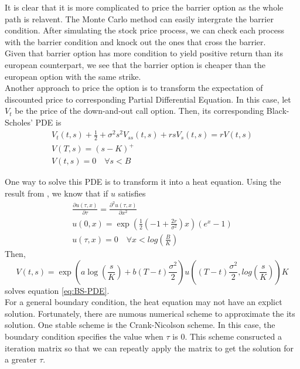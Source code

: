 \documentclass[a4paper, 11pt]{article}
\begin{document}
It is clear that it is more complicated to price the barrier option as the whole path is relavent. The Monte Carlo method can easily intergrate the barrier condition. After simulating the stock price process, we can check each process with the barrier condition and knock out the ones that cross the barrier.\\

Given that barrier option has more condition to yield positive return than its european counterpart, we see that the barrier option is cheaper than the european option with the same strike.\\

Another approach to price the option is to transform the expectation of discounted price to corresponding Partial Differential Equation. In this case, let $V_t$ be the price of the down-and-out call option. Then, its corresponding Black-Scholes' PDE is
\begin{gather}
	V_t(t,s) + \frac{1}{2} + \sigma^2 s^2 V_{ss}(t,s) + rsV_s(t,s) = rV(t,s)\nonumber\\
	V(T,s) = (s-K)^+\\
	V(t,s) = 0 \quad \forall s < B\nonumber
	\label{eq:BS-PDE}
\end{gather}

One way to solve this PDE is to transform it into a heat equation. Using the result from %
, we know that if $u$ satisfies
\begin{gather}
	\frac{\partial u(\tau,x)}{\partial \tau} = \frac{\partial^2 u(\tau,x)}{\partial x^2}\nonumber\\
	u(0,x) = \exp(\frac{1}{2}(-1+\frac{2r}{\sigma^2})x)(e^x-1)\\
	u(\tau, x) = 0 \quad \forall x < log(\frac{B}{K})\nonumber
\label{eq:heat_equation}
\end{gather}
Then, 
\begin{equation}
	V(t,s) = \exp(a\log(\frac{s}{K})+b(T-t)\frac{\sigma^2}{2})u\left((T-t )\frac{\sigma^2}{2}, log(\frac{s}{K}) \right)K
	\label{eq:BS-PDE_solution}
\end{equation}
solves equation \ref{eq:BS-PDE}.\\

For a general boundary condition, the heat equation may not have an explict solution. Fortunately, there are numous numerical scheme to approximate the its solution. One stable scheme is the Crank-Nicolson scheme. In this case, the boundary condition specifies the value when $\tau$ is 0. This scheme consructed a iteration matrix so that we can repeatly apply the matrix to get the solution for a greater $\tau$. 
\end{document}
